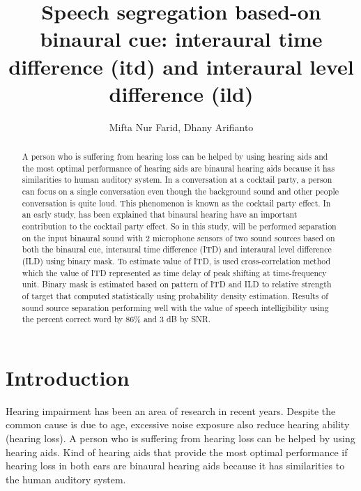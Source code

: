 \documentclass[a4paper]{jpconf}
\begin{document}
\title{Speech segregation based-on binaural cue: interaural time difference (itd) and interaural level difference (ild)}

\author{Mifta Nur Farid, Dhany Arifianto}

\address{Dept. of Engineering Physics, Faculty of Industrial Technology, Institut Teknologi Sepuluh Nopember, Kampus ITS Sukolilo, Surabaya 60111, Indonesia}


\begin{abstract}
A person who is suffering from hearing loss can be helped by using hearing aids and the most optimal performance of hearing aids are binaural hearing aids because it has similarities to human auditory system. In a conversation at a cocktail party, a person can focus on a single conversation even though the background sound and other people conversation is quite loud. This phenomenon is known as the cocktail party effect. In an early study, has been explained that binaural hearing have an important contribution to the cocktail party effect. So in this study, will be performed separation on the input binaural sound with 2 microphone sensors of two sound sources based on both the binaural cue, interaural time difference (ITD) and interaural level difference (ILD) using binary mask. To estimate value of ITD, is used cross-correlation method which the value of ITD represented as time delay of peak shifting at time-frequency unit. Binary mask is estimated based on pattern of ITD and ILD to relative strength of target that computed statistically using probability density estimation. Results of sound source separation performing well with the value of speech intelligibility using the percent correct word by 86\% and 3 dB by SNR.
\end{abstract}


\section{Introduction}
Hearing impairment has been an area of ​​research in recent years. Despite the common cause is due to age, excessive noise exposure also reduce hearing ability (hearing loss)\cite{kates2008}. A person who is suffering from hearing loss can be helped by using hearing aids. Kind of hearing aids that provide the most optimal performance if hearing loss in both ears are binaural hearing aids \cite{marin2012} because it has similarities to the human auditory system.
\end{document}
